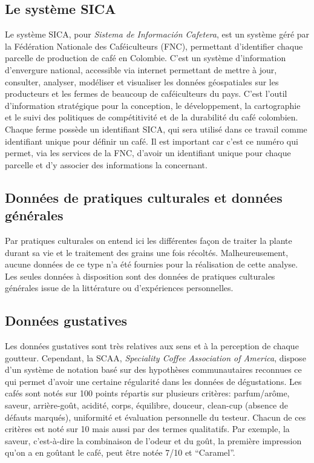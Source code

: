 \subsection{Le système SICA}Le système SICA, pour \textit{Sistema de Información Cafetera}, est un système géré par la Fédération Nationale des Caféiculteurs (FNC), permettant d'identifier chaque parcelle de production de café en Colombie. C'est un système d'information d'envergure national, accessible via internet permettant de mettre à jour, consulter, analyser, modéliser et visualiser les données géospatiales sur les producteurs et les fermes de beaucoup de caféiculteurs du pays. C'est l'outil d'information stratégique pour la conception, le développement, la cartographie et le suivi des politiques de compétitivité et de la durabilité du café colombien\cite{SICA}. Chaque ferme possède un identifiant SICA, qui sera utilisé dans ce travail comme identifiant unique pour définir un café. Il est important car c'est ce numéro qui permet, via les services de la FNC, d'avoir un identifiant unique pour chaque parcelle et d'y associer des informations la concernant.  

\subsection{Données de pratiques culturales et données générales}
Par pratiques culturales on entend ici les différentes façon de traiter la plante durant sa vie et le traitement des grains une fois récoltés. Malheureusement, aucune données de ce type n'a été fournies pour la réalisation de cette analyse. Les seules données à disposition sont des données de pratiques culturales générales issue de la littérature ou d'expériences personnelles. \cite{CoffeeImport} \cite{CCI} \cite{WikiCafeicultureColombie} \cite{InternationalCoffeeOrganisation} \cite{GuideCafe}

\subsection{Données gustatives}
Les données gustatives sont très relatives aux sens et à la perception de chaque goutteur. Cependant, la SCAA, \textit{Speciality Coffee Association of America}, dispose d’un système de notation \cite{CupingProtocol} basé sur des hypothèses communautaires reconnues ce qui permet d’avoir une certaine régularité dans les données de dégustations. Les cafés sont notés sur 100 points répartis sur plusieurs critères: parfum/arôme, saveur, arrière-goût, acidité, corps, équilibre, douceur, clean-cup (absence de défauts marqués), uniformité et évaluation personnelle du testeur.  Chacun de ces critères est noté sur 10 mais aussi par des termes qualitatifs. Par exemple, la saveur, c’est-à-dire la combinaison de l’odeur et du goût, la première impression qu’on a en goûtant le café, peut être notée 7/10 et “Caramel”. \\

